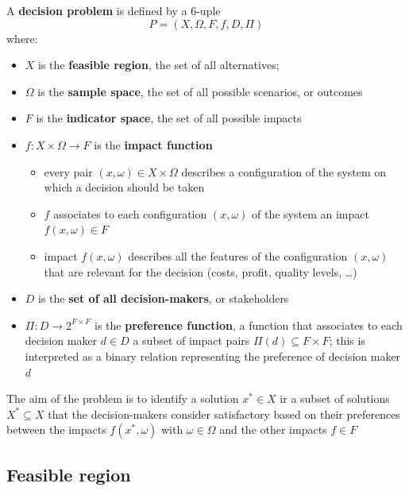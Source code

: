 \begin{definition}
	A \textbf{decision problem} is defined by a 6-uple
	$$ P = \left(X, \Omega, F, f, D, \Pi \right)$$
	where: 
	\begin{itemize}
		\item $X$ is the \textbf{feasible region}, the set of all alternatives; 
		
		\item $\Omega$ is the \textbf{sample space}, the set of all possible scenarios, or outcomes
		
		\item $F$ is the \textbf{indicator space}, the set of all possible impacts
		
		\item $f: X \times \Omega \rightarrow F$ is the \textbf{impact function}
		\begin{itemize}
			\item every pair $(x, \omega) \in X \times \Omega$ describes a configuration of the system on which a decision should be taken
			
			\item $f$ associates to each configuration $(x, \omega)$ of the system an impact $f(x, \omega) \in F$
			
			\item impact $f(x, \omega)$ describes all the features of the configuration $(x, \omega)$ that are relevant for the decision (costs, profit, quality levels, \dots)
		\end{itemize}
		
		\item $D$ is the \textbf{set of all decision-makers}, or stakeholders
		
		\item $\Pi: D \rightarrow 2^{F \times F}$ is the \textbf{preference function}, a function that associates to each decision maker $d \in D$ a subset of impact pairs $\Pi(d) \subseteq F \times F$; this is interpreted as a binary relation representing the preference of decision maker $d$
	\end{itemize}
\end{definition}

The aim of the problem is to identify a solution $x^\ast \in X$ ir a subset of solutions $X^\ast \subseteq X$ that the decision-makers consider satisfactory based on their preferences between the impacts $f(x^\ast, \omega)$ with $\omega \in \Omega$ and the other impacts $f \in F$

\subsection{Feasible region}
\label{subsec:feasibleregiondef}

